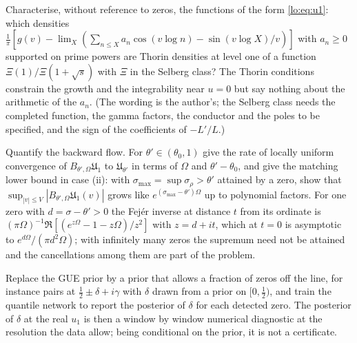 \begin{problem}\label{lo:prob:selberg}
Characterise, without reference to zeros, the functions of the form \eqref{lo:eq:u1}: which densities $\frac1\pi[g(v)-\lim_X(\sum_{n\le X}a_n\cos(v\log n)-\sin(v\log X)/v)]$ with $a_n\ge0$ supported on prime powers are Thorin densities at level one of a function $\Xi(1)/\Xi(1+\sqrt s)$ with $\Xi$ in the Selberg class? The Thorin conditions constrain the growth and the integrability near $u=0$ but say nothing about the arithmetic of the $a_n$. (The wording is the author's; the Selberg class needs the completed function, the gamma factors, the conductor and the poles to be specified, and the sign of the coefficients of $-L'/L$.)
\end{problem}

\begin{problem}\label{lo:prob:rate}
Quantify the backward flow. For $\theta'\in(\theta_0,1)$ give the rate of locally uniform convergence of $B_{\theta',\Omega}\mathfrak U_1$ to $\mathfrak U_{\theta'}$ in terms of $\Omega$ and $\theta'-\theta_0$, and give the matching lower bound in case (ii): with $\sigma_{\max}=\sup\sigma_\rho>\theta'$ attained by a zero, show that $\sup_{|v|\le V}|B_{\theta',\Omega}\mathfrak U_1(v)|$ grows like $e^{(\sigma_{\max}-\theta')\Omega}$ up to polynomial factors. For one zero with $d=\sigma-\theta'>0$ the Fej\'er inverse at distance $t$ from its ordinate is $(\pi\Omega)^{-1}\Re[(e^{z\Omega}-1-z\Omega)/z^2]$ with $z=d+it$, which at $t=0$ is asymptotic to $e^{d\Omega}/(\pi d^2\Omega)$; with infinitely many zeros the supremum need not be attained and the cancellations among them are part of the problem.
\end{problem}

\begin{problem}\label{lo:prob:delta}
Replace the GUE prior by a prior that allows a fraction of zeros off the line, for instance pairs at $\tfrac12\pm\delta+i\gamma$ with $\delta$ drawn from a prior on $[0,\tfrac12)$, and train the quantile network to report the posterior of $\delta$ for each detected zero. The posterior of $\delta$ at the real $u_1$ is then a window by window numerical diagnostic at the resolution the data allow; being conditional on the prior, it is not a certificate.
\end{problem}
